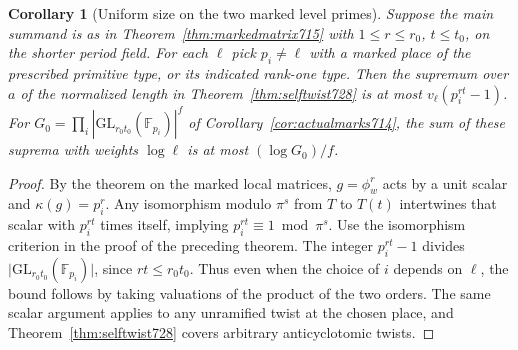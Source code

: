 \documentclass[a4paper,11pt]{article}
\newtheorem{corollary}[proposition]{Corollary}
\theoremstyle{definition}
\theoremstyle{remark}
\numberwithin{equation}{section}
\begin{document}
\begin{corollary}[Uniform size on the two marked level primes]\leavevmode
\label{cor:congcost728}
Suppose the main summand is as in Theorem~\ref{thm:markedmatrix715}
with \(1\le r\le r_0\), \(t\le t_0\), on the shorter period field.
For each \(\ell\) pick \(p_i\ne\ell\) with a marked place of the
prescribed primitive type, or its indicated rank-one type.
Then the supremum over \(a\) of the normalized length in
Theorem~\ref{thm:selftwist728} is at most \(v_\ell(p_i^{rt}-1)\).
For \(G_0=\prod_i |\mathrm{GL}_{r_0t_0}(\mathbb F_{p_i})|^f\) of
Corollary~\ref{cor:actualmarks714}, the sum of these suprema with
weights \(\log\ell\) is at most \((\log G_0)/f\).
\end{corollary}
\begin{proof}
By the theorem on the marked local matrices, \(g=\phi_w^r\) acts by
a unit scalar and \(\kappa(g)=p_i^r\). Any isomorphism modulo
\(\pi^s\) from \(T\) to \(T(t)\) intertwines that scalar with
\(p_i^{rt}\) times itself, implying \(p_i^{rt}\equiv1\bmod\pi^s\).
Use the isomorphism criterion in the proof of the preceding theorem.
The integer \(p_i^{rt}-1\) divides
\(\lvert\mathrm{GL}_{r_0t_0}(\mathbb F_{p_i})\rvert\), since
\(rt\le r_0t_0\). Thus even when the choice of \(i\) depends on
\(\ell\), the bound follows by taking valuations of the product of
the two orders. The same scalar argument applies to any unramified
twist at the chosen place, and Theorem~\ref{thm:selftwist728} covers
arbitrary anticyclotomic twists.
\end{proof}
\end{document}
